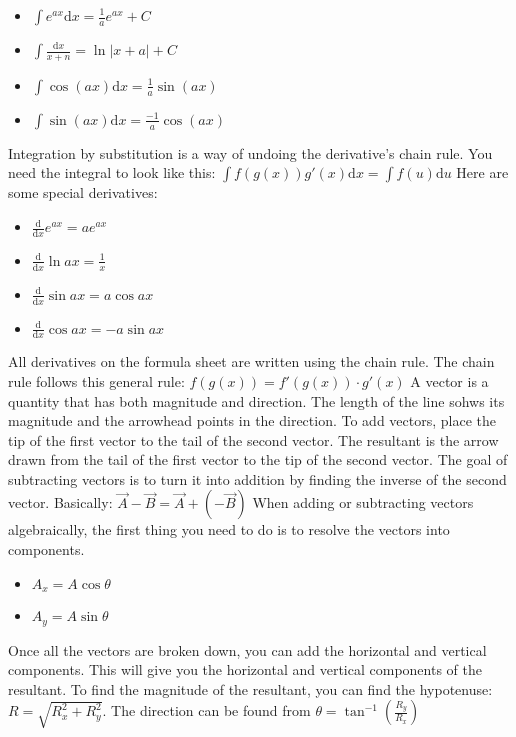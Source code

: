 \documentclass[../em.tex]{subfiles}
\begin{document}
\begin{itemize}
    \item $\int{e^{ax}}\mathrm{d}x=\frac{1}{a}e^{ax}+C$
    \item $\int \frac{\mathrm{d}x}{x+n}=\ln |x+a|+C$
    \item $\int \cos(ax)\mathrm{d}x = \frac{1}{a}\sin(ax)$
    \item $\int \sin(ax)\mathrm{d}x=\frac{-1}{a}\cos(ax)$
\end{itemize}
Integration by substitution is a way of undoing the derivative's chain rule. You need the integral to look like this:
\smallbreak
$\int f(g(x))g'(x)\mathrm{d}x=\int f(u)\mathrm{d}u$
\smallbreak
Here are some special derivatives:
\begin{itemize}
    \item $\frac{\mathrm{d}}{\mathrm{d}x}e^{ax}=ae^{ax}$
    \item $\frac{\mathrm{d}}{\mathrm{d}x}\ln ax = \frac{1}{x}$
    \item $\frac{\mathrm{d}}{\mathrm{d}x}\sin ax = a\cos ax$
    \item $\frac{\mathrm{d}}{\mathrm{d}x}\cos ax = -a\sin ax$
\end{itemize}
All derivatives on the formula sheet are written using the chain rule.
\smallbreak
The chain rule follows this general rule: $f(g(x))=f'(g(x))\cdot g'(x)$
\smallbreak
A vector is a quantity that has both magnitude and direction. The length of the line sohws its magnitude and the arrowhead points in the direction.
To add vectors, place the tip of the first vector to the tail of the second vector.
The resultant is the arrow drawn from the tail of the first vector to the tip of the second vector.
\smallbreak
The goal of subtracting vectors is to turn it into addition by finding the inverse of the second vector. Basically: $\vec{A}-\vec{B}=\vec{A}+(-\vec{B})$
\smallbreak
When adding or subtracting vectors algebraically, the first thing you need to do is to resolve the vectors into components.
\begin{itemize}
    \item $A_x = A\cos \theta$
    \item $A_y = A\sin \theta$
\end{itemize}
Once all the vectors are broken down, you can add the horizontal and vertical components. This will give you the horizontal and vertical components of the resultant.
\smallbreak
To find the magnitude of the resultant, you can find the hypotenuse: $R = \sqrt{R_x^2+R_y^2}$. The direction can be found from $\theta = \tan^{-1}\left(\frac{R_y}{R_x}\right)$
\end{document}
